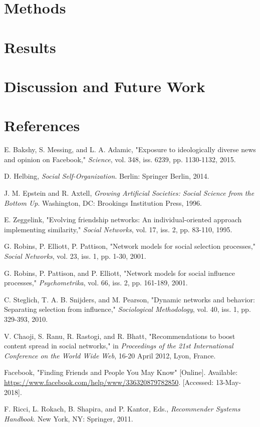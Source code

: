 \documentclass[12pt,letterpaper]{article}
\begin{document}
\section{Methods}



\section{Results}

\section{Discussion and Future Work}

\section{References}
\begin{thebibliography}{}

 E. Bakshy, S. Messing, and L. A. Adamic, "Exposure to ideologically diverse news and opinion on Facebook," \textit{Science}, vol. 348, iss. 6239, pp. 1130-1132, 2015.

 D. Helbing, \textit{Social Self-Organization}. Berlin: Springer Berlin, 2014.

 J. M. Epstein and R. Axtell, \textit{Growing Artificial Societies: Social Science from the Bottom Up}. Washington, DC: Brookings Institution Press, 1996.

 E. Zeggelink, "Evolving friendship networks: An individual-oriented approach implementing similarity," \textit{Social Networks}, vol. 17, iss. 2, pp. 83-110, 1995.

 G. Robins, P. Elliott, P. Pattison, "Network models for social selection processes," \textit{Social Networks}, vol. 23, iss. 1, pp. 1-30, 2001.

 G. Robins, P. Pattison, and P. Elliott, "Network models for social influence processes," \textit{Psychometrika}, vol. 66, iss. 2, pp. 161-189, 2001.

 C. Steglich, T. A. B. Snijders, and M. Pearson, "Dynamic networks and behavior: Separating selection from influence," \textit{Sociological Methodology}, vol. 40, iss. 1, pp. 329-393, 2010.

 V. Chaoji, S. Ranu, R. Rastogi, and R. Bhatt, "Recommendations to boost content spread in social networks," in \textit{Proceedings of the 21st International Conference on the World Wide Web}, 16-20 April 2012, Lyon, France.

 Facebook, "Finding Friends and People You May Know" [Online]. Available: \url{https://www.facebook.com/help/www/336320879782850}. [Accessed: 13-May-2018].

 F. Ricci, L. Rokach, B. Shapira, and P. Kantor, Eds., \textit{Recommender Systems Handbook}. New York, NY: Springer, 2011.



\end{thebibliography}
\end{document}
